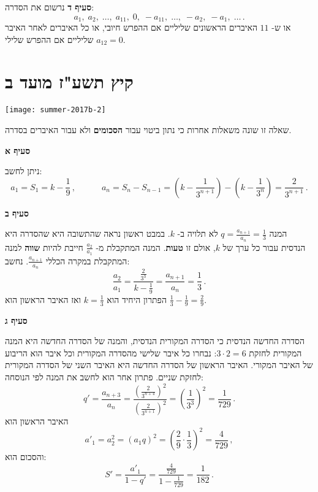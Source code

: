 \textbf{סעיף ד}
נרשום את הסדרה:
\[
a_1,\; a_2,\; \ldots,\; a_{11},\; 0,\; -a_{11},\; \ldots,\; -a_2,\; -a_1,\; \ldots\,.
\]
או ש-%
$11$
האיברים הראשונים שליליים אם ההפרש חיובי, או כל האיברים לאחר האיבר
$a_{12}=0$
שליליים אם ההפרש שלילי.



\np
\section{קיץ תשע"ז מועד ב}

\begin{center}
\texttt{[image: summer-2017b-2]}
\end{center}

שאלה זו שונה משאלות אחרות כי נתון ביטוי עבור
\textbf{הסכומים}
ולא עבור האיברים בסדרה.

\textbf{סעיף א}

ניתן לחשב:
\[
a_1=S_1=k-\frac{1}{9}\,, \quad\quad\quad a_n=S_{n}-S_{n-1}=\left(k-\frac{1}{3^{n+1}}\right)-\left(k-\frac{1}{3^{n}}\right)=\frac{2}{3^{n+1}}\,.
\]

\textbf{סעיף ב}

המנה
$q=\displaystyle\frac{a_{n+1}}{a_{n}}=\frac{1}{3}$
לא תלויה ב-%
$k$.
במבט ראשון נראה שהתשובה היא שהסדרה היא הנדסית עבור כל ערך של
$k$,
אולם זו
\textbf{טעות}.
המנה המתקבלת מ-%
$\displaystyle\frac{a_2}{a_1}$
חייבת להיות
\textbf{שווה}
למנה המתקבלת במקרה הכללי
$\displaystyle\frac{a_{n+1}}{a_{n}}$.
נחשב:
\[
\frac{a_2}{a_1}=\frac{\displaystyle\frac{2}{3^3}}{\displaystyle k-\frac{1}{9}} = \frac{a_{n+1}}{a_n}=\frac{1}{3}\,.
\]
הפתרון היחיד הוא
$k=\frac{1}{3}$
ואז האיבר הראשון הוא
$\frac{1}{3}-\frac{1}{9}=\frac{2}{9}$.

\textbf{סעיף ג}

הסדרה החדשה הנדסית כי הסדרה המקורית הנדסית, והמנה של הסדרה החדשה היא המנה המקורית לחזקת
$3\cdot 2=6$:
נבחרו כל איבר שלישי מהסדרה המקורית וכל איבר הוא הריבוע של האיבר המקורי. האיבר הראשון של הסדרה החדשה היא האיבר השני של הסדרה המקורית לחזקת שניים. פתרון אחר הוא לחשב את המנה לפי הנוסחה:
\[
q'=\frac{a_{n+3}}{a_n}=\frac{\left(\frac{2}{3^{n+4}}\right)^2}     {\left(\frac{2}{3^{n+1}}\right)^2}=\left(\frac{1}{3^3}\right)^2=\frac{1}{729}\,.
\]
האיבר הראשון הוא
\[
a'_1 = a_2^2=\left(a_1q\right)^2=\left(\frac{2}{9}\cdot\frac{1}{3}\right)^2=\frac{4}{729}\,,
\]
והסכום הוא:
\[
S'=\frac{a'_1}{1-q'}=
\frac{\displaystyle\frac{4}{729}}{1-\displaystyle\frac{1}{729}}= \frac{1}{182}\,.
\]

